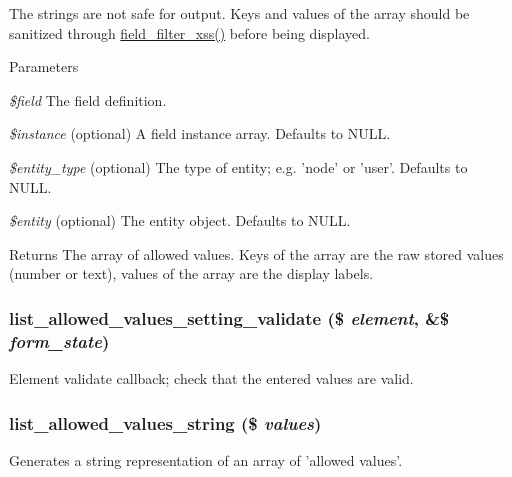 The strings are not safe for output. Keys and values of the array should be sanitized through \hyperlink{group__field_ga181095248684b8b5a45c08ab8d22a813}{field\_\-filter\_\-xss()} before being displayed.


\begin{DoxyParams}{Parameters}
\item[{\em \$field}]The field definition. \item[{\em \$instance}](optional) A field instance array. Defaults to NULL. \item[{\em \$entity\_\-type}](optional) The type of entity; e.g. 'node' or 'user'. Defaults to NULL. \item[{\em \$entity}](optional) The entity object. Defaults to NULL.\end{DoxyParams}
\begin{DoxyReturn}{Returns}
The array of allowed values. Keys of the array are the raw stored values (number or text), values of the array are the display labels. 
\end{DoxyReturn}
\hypertarget{list_8module_a87f1b0175d4b11b5d441e3b512749b58}{
\subsubsection[{list\_\-allowed\_\-values\_\-setting\_\-validate}]{\setlength{\rightskip}{0pt plus 5cm}list\_\-allowed\_\-values\_\-setting\_\-validate (\$ {\em element}, \/  \&\$ {\em form\_\-state})}}
\label{list_8module_a87f1b0175d4b11b5d441e3b512749b58}
Element validate callback; check that the entered values are valid. \hypertarget{list_8module_a398a1526738a574db51cad98a20b5590}{
\subsubsection[{list\_\-allowed\_\-values\_\-string}]{\setlength{\rightskip}{0pt plus 5cm}list\_\-allowed\_\-values\_\-string (\$ {\em values})}}
\label{list_8module_a398a1526738a574db51cad98a20b5590}
Generates a string representation of an array of 'allowed values'.

